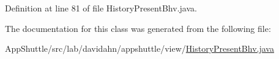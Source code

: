 \-Definition at line 81 of file \-History\-Present\-Bhv.\-java.



\-The documentation for this class was generated from the following file\-:\begin{DoxyCompactItemize}
\item 
\-App\-Shuttle/src/lab/davidahn/appshuttle/view/\hyperlink{_history_present_bhv_8java}{\-History\-Present\-Bhv.\-java}\end{DoxyCompactItemize}
